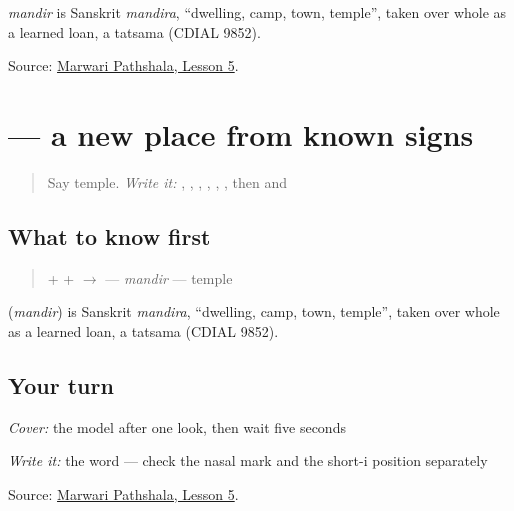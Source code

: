 \begin{cousinweb}
\emph{mandir} is Sanskrit \emph{mandira}, \textquotedblleft{}dwelling, camp, town, temple\textquotedblright{}, taken over whole as a learned loan, a tatsama (CDIAL 9852).
\end{cousinweb}

\begin{tcolorbox}[breakable,colback=teal!4,colframe=teal!35!black,title={Before you move on}]
Source: \href{https://www.marwaripathshala.com/marwari-lesson-5-english}{Marwari Pathshala, Lesson 5}.
\end{tcolorbox}
\section[\texorpdfstring{\mw{मंदिर} (mandir)}{मंदिर (mandir)}]{ — a new place from known signs}

\label{lesson:MW-C10-mandir}



\begin{quote}
Say temple. \emph{Write it:} \textbf{}, \textbf{}, \textbf{}, \textbf{}, \textbf{}, \textbf{}, then \textbf{} and \textbf{}
\end{quote}

\subsection*{What to know first}
\begin{quote}
\textbf{} + \textbf{} + \textbf{} $\to$ \textbf{} — \emph{mandir} — temple
\end{quote}

\begin{cousinweb}
\textbf{} (\emph{mandir}) is Sanskrit \emph{mandira}, \textquotedblleft{}dwelling, camp, town, temple\textquotedblright{}, taken over whole as a learned loan, a tatsama (CDIAL 9852).
\end{cousinweb}

\subsection*{Your turn}
\emph{Cover:} the model after one look, then wait five seconds

\emph{Write it:} the word — check the nasal mark and the short-i position separately

\begin{tcolorbox}[breakable,colback=teal!4,colframe=teal!35!black,title={Before you move on}]
Source: \href{https://www.marwaripathshala.com/marwari-lesson-5-english}{Marwari Pathshala, Lesson 5}.
\end{tcolorbox}
